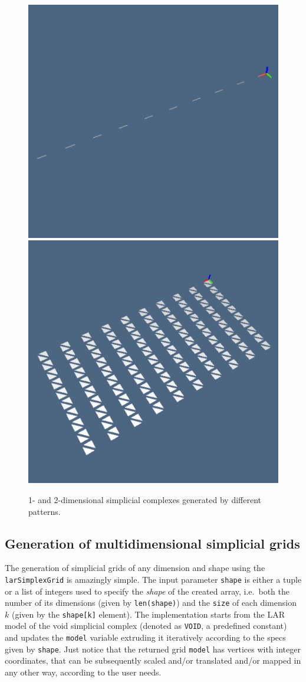 \documentclass[11pt,oneside]{article}	%
\begin{document}
\begin{figure}[htbp] %
   \centering
   \includegraphics[height=0.25\linewidth,width=0.25\linewidth]{images/simplexn-2a} 
   \includegraphics[height=0.25\linewidth,width=0.25\linewidth]{images/simplexn-2b} 
   \caption{1- and 2-dimensional simplicial complexes generated by different patterns.}
   \label{fig:example}
\end{figure}


\subsection{Generation of multidimensional simplicial grids}

The generation of simplicial grids of any dimension and shape using the \texttt{larSimplexGrid}
is amazingly simple. The input parameter \texttt{shape} is either a tuple or a list of integers used to specify the \emph{shape} of the created array, i.e.~both the number of its dimensions (given by \texttt{len(shape)}) and the \texttt{size} of each dimension $k$ (given by the \texttt{shape[k]} element).
The implementation starts from the LAR model of the void simplicial complex (denoted as \texttt{VOID}, a predefined constant) and updates the \texttt{model} variable extruding it iteratively according to the specs given by \texttt{shape}.
Just notice that the returned grid \texttt{model} has vertices with integer coordinates, that can be subsequently scaled and/or translated and/or mapped in any other way, according to the user needs.
\end{document}
